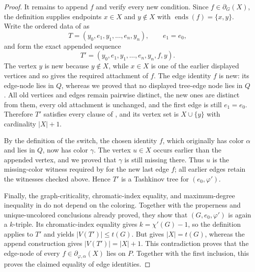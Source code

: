 \begin{proof}
It remains to append $f$ and verify every new condition.  Since
$f\in\partial_G(X)$, the definition  supplies
endpoints $x\in X$ and $y\notin X$ with
$\operatorname{ends}(f)=\{x,y\}$.  Write the ordered data of
 as
\[
 T=(y_0,e_1,y_1,\ldots,e_n,y_n),
 \qquad e_1=e_0,
\]
and form the exact appended sequence
\[
 T'=(y_0,e_1,y_1,\ldots,e_n,y_n,f,y).
\]
The vertex $y$ is new because $y\notin X$, while $x\in X$ is one of the
earlier displayed vertices and so gives the required attachment of $f$.
The edge identity $f$ is new: its edge-node lies in $Q$, whereas we proved
that no displayed tree-edge node lies in $Q$.  All old vertices and edges
remain pairwise distinct, the new ones are distinct from them, every old
attachment is unchanged, and the first edge is still $e_1=e_0$.
Therefore $T'$ satisfies every clause of , and its
vertex set is $X\cup\{y\}$ with cardinality $|X|+1$.

By the definition of the switch, the chosen identity $f$, which originally
has color $\alpha$ and lies in $Q$, now has color $\gamma$.  The vertex
$u\in X$ occurs earlier than the appended vertex, and we proved that
$\gamma$ is still missing there.  Thus $u$ is the missing-color witness
required by  for the new last edge $f$; all earlier
edges retain the witnesses checked above.  Hence $T'$ is a Tashkinov tree
for $(e_0,\varphi')$.

Finally, the graph-criticality, chromatic-index equality, and maximum-degree
inequality in  do not depend on the coloring.  Together
with the properness and unique-uncolored conclusions already proved, they
show that $(G,e_0,\varphi')$ is again a $k$-triple.  Its chromatic-index
equality gives $k=\chi'(G)-1$, so the definition
 applies to $T'$ and yields
$|V(T')|\leq t(G)$.  But  gives
$|X|=t(G)$, whereas the append construction gives
$|V(T')|=|X|+1$.  This contradiction proves that the edge-node of every
$f\in\partial_{\varphi,\alpha}(X)$ lies on $P$.  Together with the first
inclusion, this proves the claimed equality of edge identities.
\end{proof}
